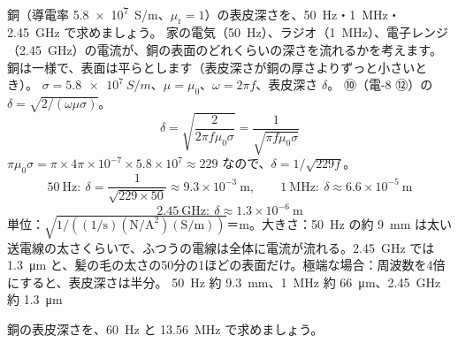 \begin{phreidai}[銅の表皮深さ]
\label{ph:電-15:ex11}銅（導電率 \qty{5.8e7}{S/m}、$\mu_{\mathrm r}=1$）の表皮深さを、\qty{50}{Hz}・\qty{1}{MHz}・\qty{2.45}{GHz} で求めましょう。
\phbamen
家の電気（\qty{50}{Hz}）、ラジオ（\qty{1}{MHz}）、電子レンジ（\qty{2.45}{GHz}）の電流が、銅の表面のどれくらいの深さを流れるかを考えます。
\phmushi
銅は一様で、表面は平らとします（表皮深さが銅の厚さよりずっと小さいとき）。
\phzu
$\sigma=\qty{5.8e7}{S/m}$、$\mu=\mu_0$、$\omega=2\pi f$、表皮深さ $\delta$。
\phriyu
⑩（電-8 ⑫）の $\delta=\sqrt{2/(\omega\mu\sigma)}$。
\phtateru
\[ \delta=\sqrt{\frac{2}{2\pi f\mu_0\sigma}}=\frac{1}{\sqrt{\pi f\mu_0\sigma}} \]
\phtoku
$\pi\mu_0\sigma=\pi\times4\pi\times10^{-7}\times5.8\times10^7\approx229$ なので、$\delta=1/\sqrt{229f}$。
\[ 50\ \mathrm{Hz}:\ \delta=\frac{1}{\sqrt{229\times50}}\approx9.3\times10^{-3}\ \mathrm{m},\qquad 1\ \mathrm{MHz}:\ \delta\approx6.6\times10^{-5}\ \mathrm{m} \]
\[ 2.45\ \mathrm{GHz}:\ \delta\approx1.3\times10^{-6}\ \mathrm{m} \]
\phtashikame
単位：$\sqrt{1/((1/\mathrm s)(\mathrm{N/A^2})(\mathrm{S/m}))}$＝m。大きさ：\qty{50}{Hz} の約 \qty{9}{mm} は太い送電線の太さくらいで、ふつうの電線は全体に電流が流れる。\qty{2.45}{GHz} では \qty{1.3}{\micro m} と、髪の毛の太さの50分の1ほどの表面だけ。極端な場合：周波数を4倍にすると、表皮深さは半分。
\kotae \qty{50}{Hz} 約 \qty{9.3}{mm}、\qty{1}{MHz} 約 \qty{66}{\micro m}、\qty{2.45}{GHz} 約 \qty{1.3}{\micro m}
\end{phreidai}
\begin{jibun}
銅の表皮深さを、\qty{60}{Hz} と \qty{13.56}{MHz} で求めましょう。
\end{jibun}

